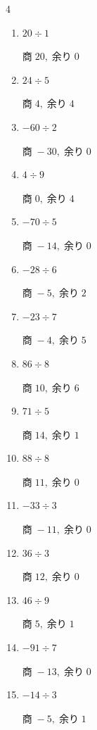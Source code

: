 \begin{multicols}{4}
\begin{enumerate}
  \item $20 \div 1$

        $商\; 20,\; 余り\; 0$

\columnbreak %

  \item $24 \div 5$

        $商\; 4,\; 余り\; 4$

  \item $-60 \div 2$

        $商\; -30,\; 余り\; 0$

  \item $4 \div 9$

        $商\; 0,\; 余り\; 4$

  \item $-70 \div 5$

        $商\; -14,\; 余り\; 0$

  \item $-28 \div 6$

        $商\; -5,\; 余り\; 2$

  \item $-23 \div 7$

        $商\; -4,\; 余り\; 5$

  \item $86 \div 8$

        $商\; 10,\; 余り\; 6$

  \item $71 \div 5$

        $商\; 14,\; 余り\; 1$

  \item $88 \div 8$

        $商\; 11,\; 余り\; 0$

  \item $-33 \div 3$

        $商\; -11,\; 余り\; 0$

  \item $36 \div 3$

        $商\; 12,\; 余り\; 0$

  \item $46 \div 9$

        $商\; 5,\; 余り\; 1$

  \item $-91 \div 7$

        $商\; -13,\; 余り\; 0$

  \item $-14 \div 3$

        $商\; -5,\; 余り\; 1$


\end{enumerate}
\end{multicols}
